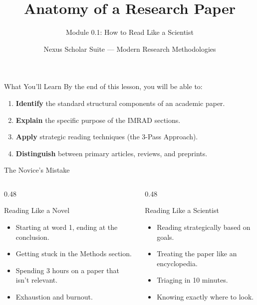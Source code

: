 \documentclass[aspectratio=169]{beamer}
\title{Anatomy of a Research Paper}
\subtitle{Module 0.1: How to Read Like a Scientist}
\author{Nexus Scholar Suite --- Modern Research Methodologies}
\date{}
\begin{document}
\begin{frame}[plain]
  \titlepage
\end{frame}

\begin{frame}{What You'll Learn}
  By the end of this lesson, you will be able to:
  \begin{enumerate}
    \item \textbf{Identify} the standard structural components of an academic paper.
    \item \textbf{Explain} the specific purpose of the IMRAD sections.
    \item \textbf{Apply} strategic reading techniques (the 3-Pass Approach).
    \item \textbf{Distinguish} between primary articles, reviews, and preprints.
  \end{enumerate}
\end{frame}

\begin{frame}{The Novice's Mistake}
  \begin{columns}[T]
    \begin{column}{0.48\textwidth}
      \begin{alertblock}{Reading Like a Novel}
        \begin{itemize}
          \item Starting at word 1, ending at the conclusion.
          \item Getting stuck in the Methods section.
          \item Spending 3 hours on a paper that isn't relevant.
          \item Exhaustion and burnout.
        \end{itemize}
      \end{alertblock}
    \end{column}
    \begin{column}{0.48\textwidth}
      \begin{block}{Reading Like a Scientist}
        \begin{itemize}
          \item Reading strategically based on goals.
          \item Treating the paper like an encyclopedia.
          \item Triaging in 10 minutes.
          \item Knowing exactly where to look.
        \end{itemize}
      \end{block}
    \end{column}
  \end{columns}
\end{frame}
\end{document}
